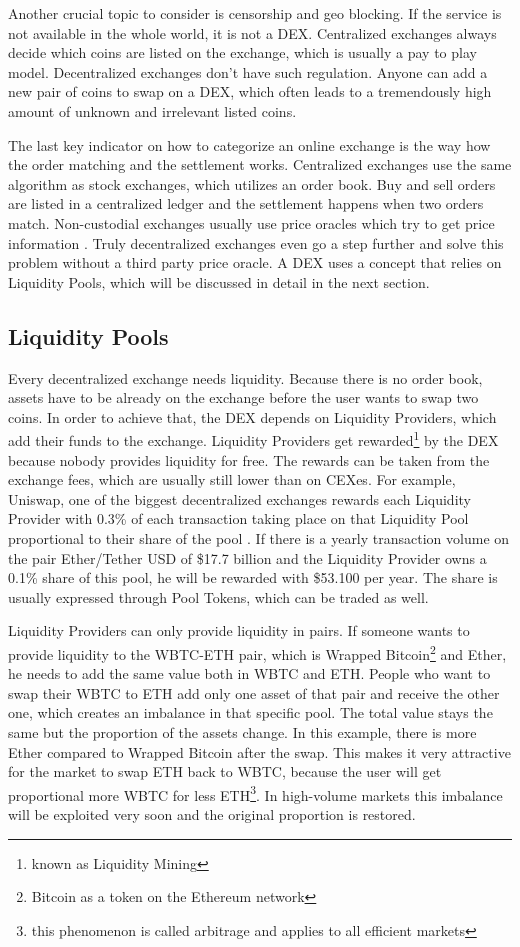 Another crucial topic to consider is censorship and geo blocking. If the service is not available in the whole world, it is not a DEX. Centralized exchanges always decide which coins are listed on the exchange, which is usually a pay to play model. Decentralized exchanges don't have such regulation. Anyone can add a new pair of coins to swap on a DEX, which often leads to a tremendously high amount of unknown and irrelevant listed coins.

The last key indicator on how to categorize an online exchange is the way how the order matching and the settlement works. Centralized exchanges use the same algorithm as stock exchanges, which utilizes an order book. Buy and sell orders are listed in a centralized ledger and the settlement happens when two orders match. Non-custodial exchanges usually use price oracles which try to get price information \cite[p.\ 47]{WuSun2018}. Truly decentralized exchanges even go a step further and solve this problem without a third party price oracle. A DEX uses a concept that relies on Liquidity Pools, which will be discussed in detail in the next section.

\subsection{Liquidity Pools}
Every decentralized exchange needs liquidity. Because there is no order book, assets have to be already on the exchange before the user wants to swap two coins. In order to achieve that, the DEX depends on Liquidity Providers, which add their funds to the exchange. Liquidity Providers get rewarded\footnote{known as Liquidity Mining} by the DEX because nobody provides liquidity for free. The rewards can be taken from the exchange fees, which are usually still lower than on CEXes. For example, Uniswap, one of the biggest decentralized exchanges rewards each Liquidity Provider with 0.3\% of each transaction taking place on that Liquidity Pool proportional to their share of the pool \cite{Uniswap2020}. If there is a yearly transaction volume on the pair Ether/Tether USD of \$17.7 billion and the Liquidity Provider owns a 0.1\% share of this pool, he will be rewarded with \$53.100 per year. The share is usually expressed through Pool Tokens, which can be traded as well.

Liquidity Providers can only provide liquidity in pairs. If someone wants to provide liquidity to the WBTC-ETH pair, which is Wrapped Bitcoin\footnote{Bitcoin as a token on the Ethereum network} and Ether, he needs to add the same value both in WBTC and ETH. People who want to swap their WBTC to ETH add only one asset of that pair and receive the other one, which creates an imbalance in that specific pool. The total value stays the same but the proportion of the assets change. In this example, there is more Ether compared to Wrapped Bitcoin after the swap. This makes it very attractive for the market to swap ETH back to WBTC, because the user will get proportional more WBTC for less ETH\footnote{this phenomenon is called arbitrage and applies to all efficient markets}. In high-volume markets this imbalance will be exploited very soon and the original proportion is restored.

